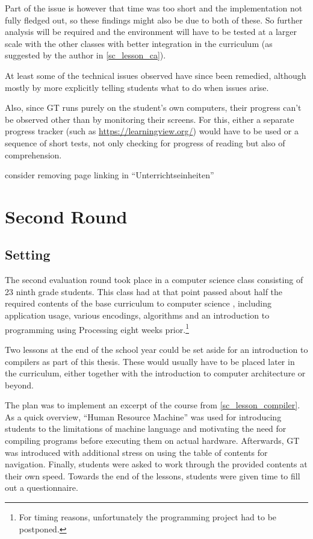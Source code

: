 Part of the issue is however that time was too short and the implementation not fully fledged out, so these findings might also be due to both of these. So further analysis will be required and the environment will have to be tested at a larger scale with the other classes with better integration in the curriculum (as suggested by the author in \ref{sc_lesson_ca}).

At least some of the technical issues observed have since been remedied, although mostly by more explicitly telling students what to do when issues arise.

Also, since \ac{GT} runs purely on the student's own computers, their progress can't be observed other than by monitoring their screens. For this, either a separate progress tracker (such as \url{https://learningview.org/}) would have to be used or a sequence of short tests, not only checking for progress of reading but also of comprehension.

\begin{todo}
\item consider removing page linking in ``Unterrichtseinheiten''
\end{todo}



\section{Second Round} \label{sc_validation_compiler} %

\subsection{Setting}

The second evaluation round took place in a computer science class consisting of 23 ninth grade students. This class had at that point passed about half the required contents of the base curriculum to computer science \cite[p.\,145--146]{Erz16}, including application usage, various encodings, algorithms and an introduction to programming using Processing eight weeks prior.\footnote{For timing reasons, unfortunately the programming project had to be postponed.}

Two lessons at the end of the school year could be set aside for an introduction to compilers as part of this thesis. These would usually have to be placed later in the curriculum, either together with the introduction to computer architecture or beyond.

The plan was to implement an excerpt of the course from \ref{sc_lesson_compiler}. As a quick overview, ``Human Resource Machine'' was used for introducing students to the limitations of machine language and motivating the need for compiling programs before executing them on actual hardware. Afterwards, \ac{GT} was introduced with additional stress on using the table of contents for navigation. Finally, students were asked to work through the provided contents at their own speed. Towards the end of the lessons, students were given time to fill out a questionnaire.


